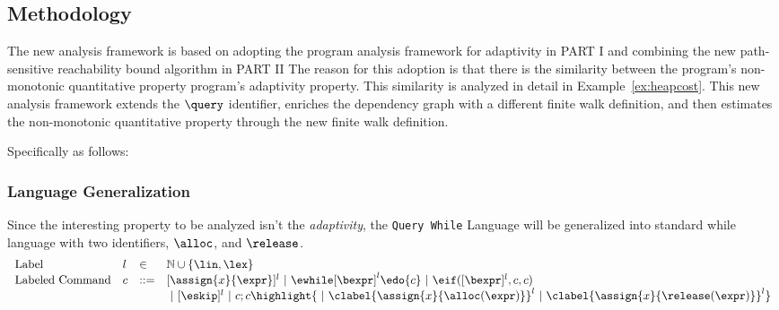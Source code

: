 \subsection{Methodology}
\label{sec:nonmonotonic-methodology}
The new analysis framework is based on adopting the program analysis framework for adaptivity in PART I and combining the new path-sensitive reachability bound algorithm in PART II
The reason for this adoption is that there is 
the similarity between the program's non-monotonic quantitative property
program's adaptivity property. This similarity is analyzed in detail in Example~\ref{ex:heapcost}.
This new analysis framework extends the $\query$ identifier,
enriches the dependency graph with a different finite walk definition, and then estimates
the non-monotonic quantitative property through the new finite walk definition.

Specifically as follows:
\subsubsection{Language Generalization} Since the interesting property 
to be analyzed isn't the \emph{adaptivity},
the {\tt Query While} Language will be generalized into standard while language with two identifiers, $\alloc$, and $\release$.
\[
\begin{array}{llll}
\mbox{Label} 
& l & \in & \mathbb{N} \cup \{\lin, \lex\} \\
\mbox{Labeled Command} 
& {c} & ::= & [\assign {{x}}{ {\expr}}]^{l} 
~|~ {\ewhile [ \bexpr ]^{l} \edo {c} }
~|~ \eif([\bexpr]{}^l , {c}, {c})
 \\
 &&&
 ~|~ [\eskip]^l ~|~ {c};{c} 
\highlight{~|~ \clabel{\assign {{x} }{{\alloc(\expr)}}}^{l} ~|~ \clabel{\assign {{x} }{{\release(\expr)}}}^{l}}
\end{array}
\]
